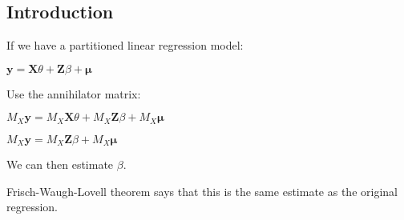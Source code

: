 
\subsection{Introduction}

If we have a partitioned linear regression model:

\(\mathbf y=\mathbf X\theta+\mathbf Z\beta+\mathbf \mu\)

Use the annihilator matrix:

\(M_X\mathbf y=M_X\mathbf X\theta+M_X\mathbf Z\beta+M_X\mathbf \mu\)

\(M_X\mathbf y=M_X\mathbf Z\beta+M_X\mathbf \mu\)

We can then estimate \(\beta \).

Frisch-Waugh-Lovell theorem says that this is the same estimate as the original regression.

